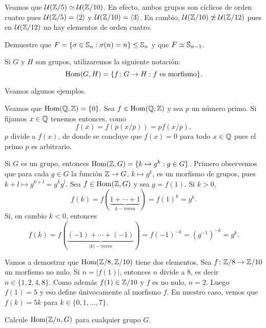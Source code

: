\begin{example}
Veamos que $\mathcal{U}(\mathbb{Z}/5)\simeq\mathcal{U}(\mathbb{Z}/10)$. 
En efecto, ambos grupos son cíclicos de orden cuatro pues 
$\mathcal{U}(\mathbb{Z}/5)=\langle 2\rangle$ y $\mathcal{U}(\mathbb{Z}/10)=\langle 3\rangle$. 
En cambio, $\mathcal{U}(\mathbb{Z}/10)\not\simeq\mathcal{U}(\mathbb{Z}/12)$ pues
en $\mathcal{U}(\mathbb{Z}/12)$ no hay elementos de orden cuatro.  
\end{example}

\begin{exercise}	
Demuestre que $F=\{\sigma\in\mathbb{S}_n:\sigma(n)=n\}\leq\mathbb{S}_n$ y que $F\simeq\mathbb{S}_{n-1}$. 
\end{exercise}

Si $G$ y $H$ son grupos, utilizaremos la siguiente notación:
\[
\operatorname{Hom}(G,H)=\{f\colon G\to H:f\text{ es morfismo}\}.
\]

Veamos algunos ejemplos.

\begin{example}
Veamos que 
$\operatorname{Hom}(\mathbb{Q},\mathbb{Z})=\{0\}$. Sea $f\in\operatorname{Hom}(\mathbb{Q},\mathbb{Z})$ y sea $p$ un número primo. Si fijamos $x\in\mathbb{Q}$ tenemos entonces, como 
\[
f(x)=f\left(p(x/p)\right)=pf(x/p),
\]	
$p$ divide a $f(x)$, de donde se concluye que $f(x)=0$ para todo $x\in\mathbb{Q}$ pues el primo $p$ es arbitrario.  
\end{example}

\begin{example}
Si $G$ es un grupo, entonces $\operatorname{Hom}(\mathbb{Z},G)=\{k\mapsto g^k:g\in G\}$. 
Primero observemos que para cada $g\in G$ la función $\mathbb{Z}\to G$, $k\mapsto g^k$, es un morfismo de grupos, pues $k+l\mapsto g^{k+l}=g^kg^l$. Sea $f\in\operatorname{Hom}(\mathbb{Z},G)$ y sea $g=f(1)$. Si $k>0$, 
\[
f(k)=f(\underbrace{1+\cdots+1}_{k-\text{veces}})=f(1)^k=g^k.
\]
Si, en cambio $k<0$, entonces 
\[
f(k)=f(\underbrace{(-1)+\cdots+(-1)}_{|k|-\text{veces}})=f(-1)^{-k}=(g^{-1})^{-k}=g^k.
\]	
\end{example}

\begin{example}
Vamos a demostrar que $\operatorname{Hom}(\mathbb{Z}/8,\mathbb{Z}/10)$ tiene dos elementos. 
Sea $f\colon\mathbb{Z}/8\to\mathbb{Z}/10$ un morfismo no nulo. Si $n=|f(1)|$, entonces
$n$ divide a $8$, es decir $n\in\{1,2,4,8\}$. Como además $f(1)\in\mathbb{Z}/10$ y $f$ es no nulo, 
$n=2$. Luego $f(1)=5$ y eso define únivocamente al morfismo $f$. En nuestro caso, vemos que  
$f(k)=5k$ para $k\in\{0,1,\dots,7\}$. 	
\end{example}

\begin{exercise}
Calcule $\operatorname{Hom}(\mathbb{Z}/n,G)$ para cualquier grupo $G$. 
\end{exercise}

